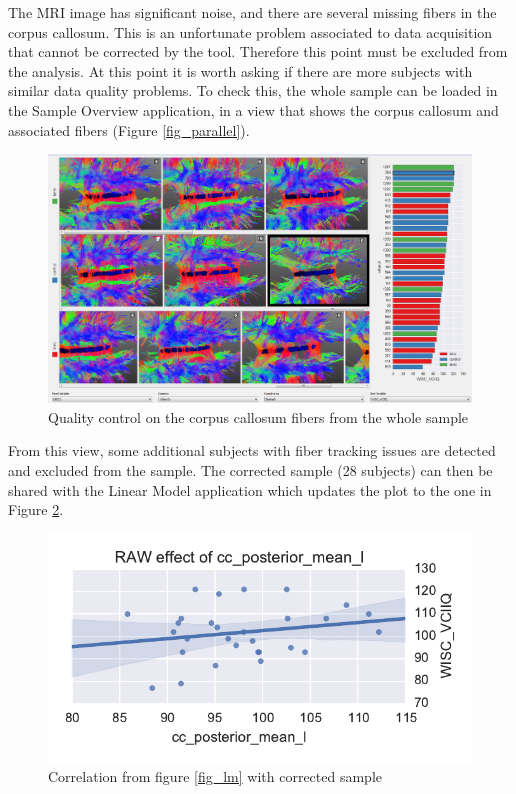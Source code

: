 \documentclass[twocolumn]{svjour3}
\begin{document}
The MRI image has significant noise, and there are several missing fibers in the corpus callosum. This is an unfortunate problem associated to data acquisition that cannot be corrected by the tool. Therefore this point must be excluded from the analysis. At this point it is worth asking if there are more subjects with similar data quality problems. To check this, the whole sample can be loaded in the Sample Overview application, in a view that shows the corpus callosum and associated fibers (Figure \ref{fig_parallel}).

\begin{figure}
\begin{center}
\includegraphics[width=\linewidth]{figures/cases/quality_control_trim}
\end{center}
 \caption{\label{fig_sample} Quality control on the corpus callosum fibers from the whole sample}
\end{figure}

From this view, some additional subjects with fiber tracking issues are detected and excluded from the sample. The corrected sample (28 subjects) can then be shared with the Linear Model application which updates the plot to the one in Figure \ref{fig_lm2}.


\begin{figure}
\begin{center}
\includegraphics[width=\linewidth]{figures/cases/final_corr}
\end{center}
 \caption{\label{fig_lm2} Correlation from figure \ref{fig_lm} with corrected sample}
\end{figure}
\end{document}
